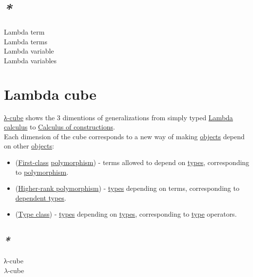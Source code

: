 \documentclass[a4paper,14pt,oneside]{book}
\begin{document}
\section{\emph{*}}
\label{sec:orgc6c135a}

\label{orge60c3d2}Lambda term\\
\label{org4000e29}Lambda terms\\
\label{orgfb874ff}Lambda variable\\
\label{org1e52d42}Lambda variables\\

\section{\label{org94edecd}Lambda cube}
\label{sec:orgf57ff4c}
\hyperref[orgbbb5b8f]{λ-cube} shows the 3 dimentions of generalizations from simply typed \hyperref[org293c423]{Lambda calculus} to \hyperref[org9e37fd1]{Calculus of constructions}.\\

Each dimension of the cube corresponds to a new way of making \hyperref[org7a81896]{objects} depend on other \hyperref[org7a81896]{objects}:\\
\begin{itemize}
\item (\hyperref[org9b22ff7]{First-class} \hyperref[org33818fe]{polymorphism}) - terms allowed to depend on \hyperref[orgcd0efa8]{types}, corresponding to \hyperref[org33818fe]{polymorphism}.\\
\item (\hyperref[org0a7453b]{Higher-rank polymorphism}) - \hyperref[orgcd0efa8]{types} depending on terms, corresponding to \hyperref[org8ea30a2]{dependent types}.\\
\item (\hyperref[org2d16679]{Type class}) - \hyperref[orgcd0efa8]{types} depending on \hyperref[orgcd0efa8]{types}, corresponding to \hyperref[org258d25a]{type} operators.\\
\end{itemize}

\subsection{\emph{*}}
\label{sec:orgc5db5e1}

\label{orgbbb5b8f}λ-cube\\
\label{orgda008c0}\(\lambda\)-cube\\
\end{document}
